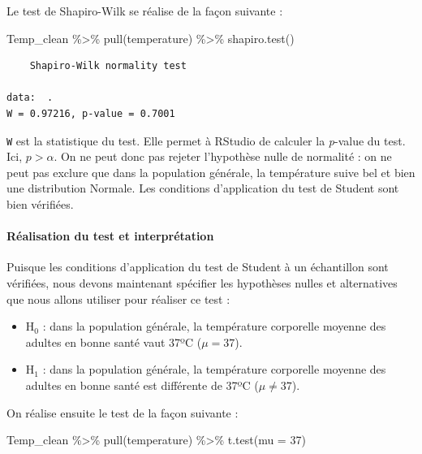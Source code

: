 \documentclass[
  a4paper,
]{article}
\newenvironment{Shaded}{\begin{snugshade}}{\end{snugshade}}
\newcommand{\AttributeTok}[1]{\textcolor[rgb]{0.00,0.34,0.68}{#1}}
\newcommand{\DecValTok}[1]{\textcolor[rgb]{0.69,0.50,0.00}{#1}}
\newcommand{\FunctionTok}[1]{\textcolor[rgb]{0.39,0.29,0.61}{#1}}
\newcommand{\NormalTok}[1]{\textcolor[rgb]{0.12,0.11,0.11}{#1}}
\newcommand{\SpecialCharTok}[1]{\textcolor[rgb]{0.24,0.68,0.91}{#1}}
\providecommand{\tightlist}{%
  \setlength{\itemsep}{0pt}\setlength{\parskip}{0pt}}
\begin{document}
Le test de Shapiro-Wilk se réalise de la façon suivante :

\begin{Shaded}
\begin{Highlighting}[]
\NormalTok{Temp\_clean }\SpecialCharTok{\%\textgreater{}\%} 
  \FunctionTok{pull}\NormalTok{(temperature) }\SpecialCharTok{\%\textgreater{}\%} 
  \FunctionTok{shapiro.test}\NormalTok{()}
\end{Highlighting}
\end{Shaded}

\begin{verbatim}
    Shapiro-Wilk normality test

data:  .
W = 0.97216, p-value = 0.7001
\end{verbatim}

\texttt{W} est la statistique du test. Elle permet à RStudio de calculer la \emph{p}-value du test. Ici, \(p > \alpha\). On ne peut donc pas rejeter l'hypothèse nulle de normalité : on ne peut pas exclure que dans la population générale, la température suive bel et bien une distribution Normale. Les conditions d'application du test de Student sont bien vérifiées.

\hypertarget{ruxe9alisation-du-test-et-interpruxe9tation}{%
\paragraph{Réalisation du test et interprétation}\label{ruxe9alisation-du-test-et-interpruxe9tation}}

Puisque les conditions d'application du test de Student à un échantillon sont vérifiées, nous devons maintenant spécifier les hypothèses nulles et alternatives que nous allons utiliser pour réaliser ce test :

\begin{itemize}
\tightlist
\item
  H\(_0\) : dans la population générale, la température corporelle moyenne des adultes en bonne santé vaut 37ºC (\(\mu = 37\)).
\item
  H\(_1\) : dans la population générale, la température corporelle moyenne des adultes en bonne santé est différente de 37ºC (\(\mu \neq 37\)).
\end{itemize}

On réalise ensuite le test de la façon suivante :

\begin{Shaded}
\begin{Highlighting}[]
\NormalTok{Temp\_clean }\SpecialCharTok{\%\textgreater{}\%} 
  \FunctionTok{pull}\NormalTok{(temperature) }\SpecialCharTok{\%\textgreater{}\%} 
  \FunctionTok{t.test}\NormalTok{(}\AttributeTok{mu =} \DecValTok{37}\NormalTok{)}
\end{Highlighting}
\end{Shaded}
\end{document}
